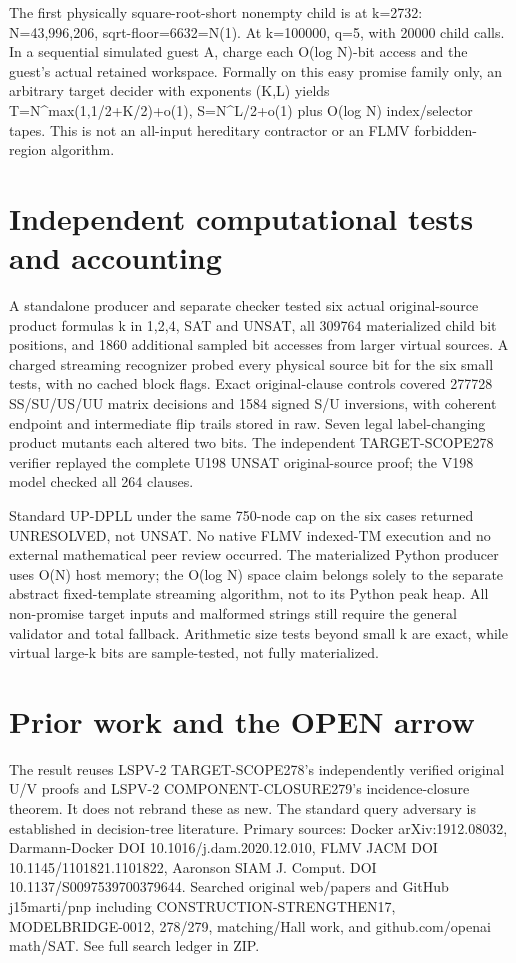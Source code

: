 \documentclass[11pt]{article}
\begin{document}
The first physically square-root-short nonempty child is at k=2732: N=43,996,206, sqrt-floor=6632=N(1). At k=100000, q=5, with 20000 child calls. In a sequential simulated guest A, charge each O(log N)-bit access and the guest's actual retained workspace. Formally on this easy promise family only, an arbitrary target decider with exponents (K,L) yields T=N^{max(1,1/2+K/2)+o(1)}, S=N^{L/2+o(1)} plus O(log N) index/selector tapes. This is not an all-input hereditary contractor or an FLMV forbidden-region algorithm.

\section{Independent computational tests and accounting}
A standalone producer and separate checker tested six actual original-source product formulas k in {1,2,4}, SAT and UNSAT, all 309764 materialized child bit positions, and 1860 additional sampled bit accesses from larger virtual sources. A charged streaming recognizer probed every physical source bit for the six small tests, with no cached block flags. Exact original-clause controls covered 277728 SS/SU/US/UU matrix decisions and 1584 signed S/U inversions, with coherent endpoint and intermediate flip trails stored in raw. Seven legal label-changing product mutants each altered two bits. The independent TARGET-SCOPE278 verifier replayed the complete U198 UNSAT original-source proof; the V198 model checked all 264 clauses.

Standard UP-DPLL under the same 750-node cap on the six cases returned UNRESOLVED, not UNSAT. No native FLMV indexed-TM execution and no external mathematical peer review occurred. The materialized Python producer uses O(N) host memory; the O(log N) space claim belongs solely to the separate abstract fixed-template streaming algorithm, not to its Python peak heap. All non-promise target inputs and malformed strings still require the general validator and total fallback. Arithmetic size tests beyond small k are exact, while virtual large-k bits are sample-tested, not fully materialized.

\section{Prior work and the OPEN arrow}
The result reuses LSPV-2 TARGET-SCOPE278's independently verified original U/V proofs and LSPV-2 COMPONENT-CLOSURE279's incidence-closure theorem. It does not rebrand these as new. The standard query adversary is established in decision-tree literature. Primary sources: Docker arXiv:1912.08032, Darmann-Docker DOI 10.1016/j.dam.2020.12.010, FLMV JACM DOI 10.1145/1101821.1101822, Aaronson SIAM J. Comput. DOI 10.1137/S0097539700379644. Searched original web/papers and GitHub j15marti/pnp including CONSTRUCTION-STRENGTHEN17, MODELBRIDGE-0012, 278/279, matching/Hall work, and github.com/openai math/SAT. See full search ledger in ZIP.
\end{document}
